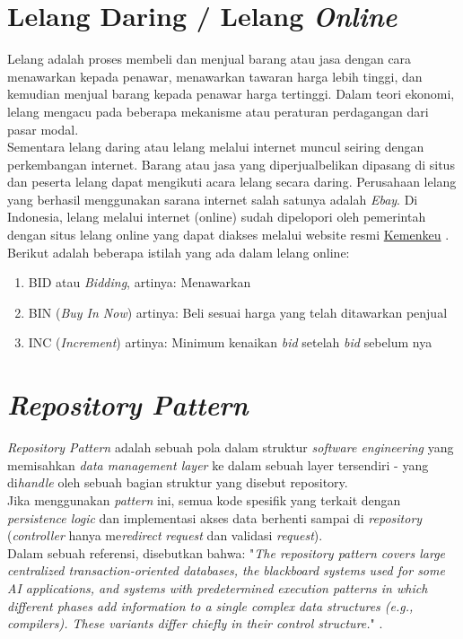   \section{Lelang Daring / Lelang \textit{Online}}
   Lelang adalah proses membeli dan menjual barang atau jasa dengan cara menawarkan kepada penawar, menawarkan tawaran harga lebih tinggi, dan kemudian menjual barang kepada penawar harga tertinggi. Dalam teori ekonomi, lelang mengacu pada beberapa mekanisme atau peraturan perdagangan dari pasar modal. \\
	Sementara lelang daring atau lelang melalui internet muncul seiring dengan perkembangan internet. Barang atau jasa yang diperjualbelikan dipasang di situs dan peserta lelang dapat mengikuti acara lelang secara daring. Perusahaan lelang yang berhasil menggunakan sarana internet salah satunya adalah \textit{Ebay}. Di Indonesia, lelang melalui internet (online) sudah dipelopori oleh pemerintah dengan situs lelang online yang dapat diakses melalui website resmi \href{https://www.lelangdjkn.kemenkeu.go.id}{Kemenkeu} \cite{wikipedia_lelang_2016}. 
    Berikut adalah beberapa istilah yang ada dalam lelang online:
    \begin{enumerate}
	\item BID atau \textit{Bidding}, artinya: Menawarkan
    \item BIN (\textit{Buy In Now}) artinya: Beli sesuai harga yang telah ditawarkan penjual
    \item INC (\textit{Increment}) artinya: Minimum kenaikan \textit{bid} setelah \textit{bid} sebelum nya \cite{noauthor_arti_nodate}
    \end{enumerate}
   
   \section{\textit{Repository Pattern}}
	\textit{Repository Pattern} adalah sebuah pola dalam struktur \textit{software engineering} yang memisahkan \textit{data management layer} ke dalam sebuah layer tersendiri - yang di\textit{handle} oleh sebuah bagian struktur yang disebut repository. 
	\\ \indent
	Jika menggunakan \textit{pattern} ini, semua kode spesifik yang terkait dengan \textit{persistence logic} dan implementasi akses data berhenti sampai di \textit{repository} (\textit{controller} hanya me\textit{redirect} \textit{request} dan validasi \textit{request})\cite{noauthor_repository_2016}.
	\\ \indent
   Dalam sebuah referensi, disebutkan bahwa: "\textit{The repository pattern covers large centralized transaction-oriented databases, the blackboard systems used for some AI applications, and systems with predetermined execution patterns in which different phases add information to a single complex data structures (e.g., compilers). These variants differ chiefly in their control structure.}" \cite{shaw_patterns_1996}.
   
